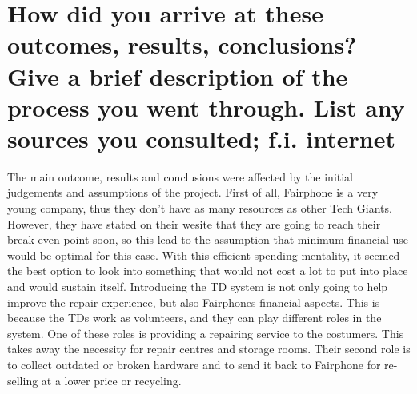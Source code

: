\section{How did you arrive at these outcomes, results, conclusions? Give a brief description of the process you went through. List any sources you consulted; f.i. internet}

The main outcome, results and conclusions were affected by the initial judgements and assumptions of the project. First of all, Fairphone is a very young company, thus they don't have as many resources as other Tech Giants. However, they have stated on their wesite that they are going to reach their break-even point soon, so this lead to the assumption that minimum financial use would be optimal for this case. With this efficient spending mentality, it seemed the best option to look into something that would not cost a lot to put into place and would sustain itself. Introducing the TD system is not only going to help improve the repair experience, but also Fairphones financial aspects. This is because the TDs work as volunteers, and they can play different roles in the system. One of these roles is providing a repairing service to the costumers. This takes away the necessity for repair centres and storage rooms. Their second role is to collect outdated or broken hardware and to send it back to Fairphone for re-selling at a lower price or recycling.